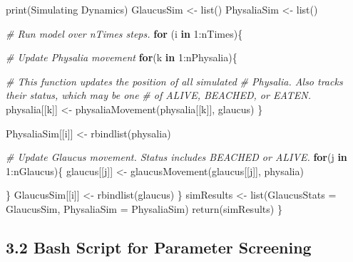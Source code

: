 \documentclass[
]{article}
\newenvironment{Shaded}{\begin{snugshade}}{\end{snugshade}}
\newcommand{\CommentTok}[1]{\textcolor[rgb]{0.56,0.35,0.01}{\textit{#1}}}
\newcommand{\ControlFlowTok}[1]{\textcolor[rgb]{0.13,0.29,0.53}{\textbf{#1}}}
\newcommand{\DecValTok}[1]{\textcolor[rgb]{0.00,0.00,0.81}{#1}}
\newcommand{\FunctionTok}[1]{\textcolor[rgb]{0.00,0.00,0.00}{#1}}
\newcommand{\NormalTok}[1]{#1}
\newcommand{\OtherTok}[1]{\textcolor[rgb]{0.56,0.35,0.01}{#1}}
\newcommand{\SpecialCharTok}[1]{\textcolor[rgb]{0.00,0.00,0.00}{#1}}
\newcommand{\StringTok}[1]{\textcolor[rgb]{0.31,0.60,0.02}{#1}}
\begin{document}
\begin{Shaded}
\begin{Highlighting}[]
  \FunctionTok{print}\NormalTok{(}\StringTok{\textquotesingle{}Simulating Dynamics\textquotesingle{}}\NormalTok{)}
\NormalTok{  GlaucusSim }\OtherTok{\textless{}{-}} \FunctionTok{list}\NormalTok{()}
\NormalTok{  PhysaliaSim }\OtherTok{\textless{}{-}} \FunctionTok{list}\NormalTok{()}

  \CommentTok{\# Run model over nTimes steps.}
  \ControlFlowTok{for}\NormalTok{ (i }\ControlFlowTok{in} \DecValTok{1}\SpecialCharTok{:}\NormalTok{nTimes)\{}

    \CommentTok{\# Update Physalia movement}
    \ControlFlowTok{for}\NormalTok{(k }\ControlFlowTok{in} \DecValTok{1}\SpecialCharTok{:}\NormalTok{nPhysalia)\{}
      
      \CommentTok{\# This function updates the position of all simulated}
      \CommentTok{\# Physalia. Also tracks their \textquotesingle{}status\textquotesingle{}, which may be one}
      \CommentTok{\# of \textquotesingle{}ALIVE\textquotesingle{}, \textquotesingle{}BEACHED\textquotesingle{}, or \textquotesingle{}EATEN\textquotesingle{}.}
\NormalTok{      physalia[[k]] }\OtherTok{\textless{}{-}} \FunctionTok{physaliaMovement}\NormalTok{(physalia[[k]], glaucus)}
\NormalTok{    \}}

\NormalTok{    PhysaliaSim[[i]] }\OtherTok{\textless{}{-}} \FunctionTok{rbindlist}\NormalTok{(physalia)}
    
    
    \CommentTok{\# Update Glaucus movement. Status includes \textquotesingle{}BEACHED\textquotesingle{} or \textquotesingle{}ALIVE\textquotesingle{}.}
    \ControlFlowTok{for}\NormalTok{(j }\ControlFlowTok{in} \DecValTok{1}\SpecialCharTok{:}\NormalTok{nGlaucus)\{}
\NormalTok{      glaucus[[j]] }\OtherTok{\textless{}{-}} \FunctionTok{glaucusMovement}\NormalTok{(glaucus[[j]], physalia)}
      
\NormalTok{    \}}
\NormalTok{    GlaucusSim[[i]] }\OtherTok{\textless{}{-}} \FunctionTok{rbindlist}\NormalTok{(glaucus)}
\NormalTok{  \}}
\NormalTok{  simResults }\OtherTok{\textless{}{-}} \FunctionTok{list}\NormalTok{(}\StringTok{\textquotesingle{}GlaucusStats\textquotesingle{}} \OtherTok{=}\NormalTok{ GlaucusSim,}
                     \StringTok{\textquotesingle{}PhysaliaSim\textquotesingle{}} \OtherTok{=}\NormalTok{ PhysaliaSim)}
  \FunctionTok{return}\NormalTok{(simResults)}
\NormalTok{\}}
\end{Highlighting}
\end{Shaded}

\hypertarget{bash-script-for-parameter-screening}{%
\subsection{3.2 Bash Script for Parameter
Screening}\label{bash-script-for-parameter-screening}}
\end{document}
